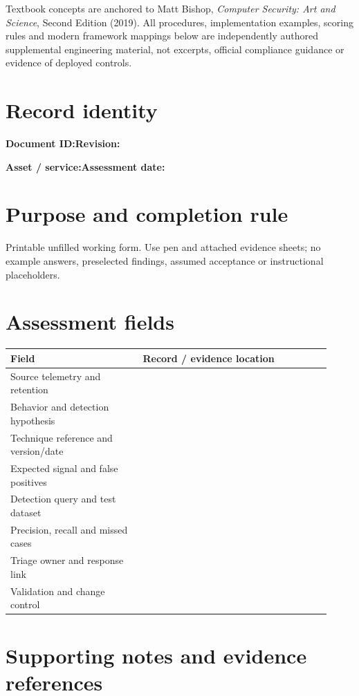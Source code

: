 \documentclass[10pt,letterpaper]{article}
\begin{document}
\makedoctocpage
\begin{notebox}
Textbook concepts are anchored to Matt Bishop, \emph{Computer Security: Art and Science}, Second Edition (2019). All procedures, implementation examples, scoring rules and modern framework mappings below are independently authored supplemental engineering material, not excerpts, official compliance guidance or evidence of deployed controls.
\end{notebox}
\section{Record identity}
\textbf{Document ID:}\enspace\hrulefill\quad\textbf{Revision:}\enspace\hrulefill
\par\medskip\textbf{Asset / service:}\enspace\hrulefill\quad\textbf{Assessment date:}\enspace\hrulefill
\section{Purpose and completion rule}
Printable unfilled working form. Use pen and attached evidence sheets; no example answers, preselected findings, assumed acceptance or instructional placeholders.
\section{Assessment fields}
\renewcommand{\arraystretch}{1.8}
\begin{longtable}{@{}p{0.38\linewidth}p{0.54\linewidth}@{}}
\toprule\textbf{Field}&\textbf{Record / evidence location}\\\midrule\endhead
Source telemetry and retention & \rule{0pt}{1.3cm}\\\midrule
Behavior and detection hypothesis & \rule{0pt}{1.3cm}\\\midrule
Technique reference and version/date & \rule{0pt}{1.3cm}\\\midrule
Expected signal and false positives & \rule{0pt}{1.3cm}\\\midrule
Detection query and test dataset & \rule{0pt}{1.3cm}\\\midrule
Precision, recall and missed cases & \rule{0pt}{1.3cm}\\\midrule
Triage owner and response link & \rule{0pt}{1.3cm}\\\midrule
Validation and change control & \rule{0pt}{1.3cm}\\\midrule
\bottomrule\end{longtable}
\section{Supporting notes and evidence references}
\end{document}

